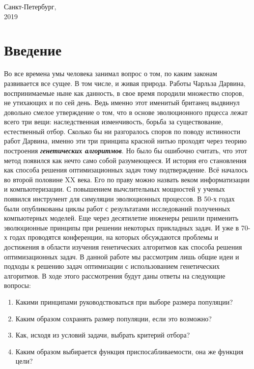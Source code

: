 \vspace{4 cm}

\begin{center}
Санкт-Петербург,\\
2019
\end{center}


\pagestyle{fancy}
\fancyhf{}
\fancyfoot[C]{\thepage}
\renewcommand{\headrulewidth}{0pt}
\renewcommand{\footrulewidth}{0pt}
\tableofcontents
\pagebreak

\newcommand{\defn}[1]{\textbf{\textit{#1}}}

\chapter*{Введение}
Во все времена умы человека занимал вопрос о том, по каким законам развивается все сущее. В том числе, и живая природа. Работы Чарльза Дарвина, воспринимаемые ныне как данность, в свое время породили множество споров, не утихающих и по сей день. Ведь именно этот именитый британец выдвинул довольно смелое утверждение о том, что в основе эволюционного прцесса лежат всего три вещи: наследственная изменчивость, борьба за существование, естественный отбор. Сколько бы ни разгоралось споров по поводу истинности работ Дарвина, именно эти три принципа красной нитью проходят через теорию построения \defn{генетических алгоритмов}.
Но было бы ошибочно считать, что этот метод появился как нечто само собой разумеющееся. И история его становления как способа решения оптимизационных задач тому подтверждение. Всё началось во второй половине XX века. Его по праву можно назвать веком информатизации и компьютеризации. С повышением вычслительных мощностей у ученых появился инструмент для симуляции эволюционных процессов. В 50-х годах были опубликованы циклы работ с результатами исследований полученных компьютерных моделей. Еще через десятилетие инженеры решили применить эволюционные принципы при решении некоторых прикладных задач. И уже в 70-х годах проводятся конференции, на которых обсуждаются проблемы и достижения в области изучения генетических алгоритмов как способа решения оптимизационных задач.
В данной работе мы рассмотрим лишь общие идеи и подходы к решению задач оптимизации с использованием генетических алгоритмов. В ходе этого рассмотрения будут даны ответы на следующие вопросы:
\begin{enumerate}
\item Какими принципами руководствоваться при выборе размера популяции?
\item Каким образом сохранять размер популяции, если это возможно?
\item Как, исходя из условий задачи, выбрать критерий отбора?
\item Каким образом выбирается функция приспосабливаемости, она же функция цели?
\end{enumerate}
